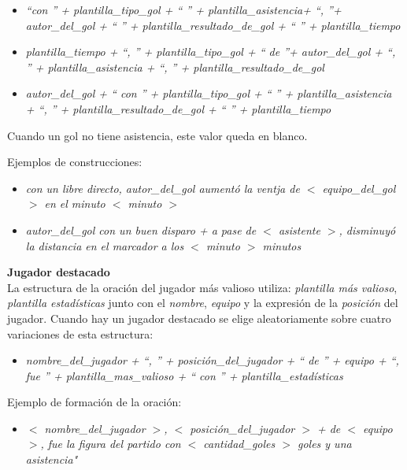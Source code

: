 
    \begin{itemize}
        \item \textit{ “con ” + plantilla\_tipo\_gol + “ ” + plantilla\_asistencia+ “, ”+ autor\_del\_gol + “ ” + plantilla\_resultado\_de\_gol + “ ” + plantilla\_tiempo}
        \item \textit{plantilla\_tiempo + “, ” + plantilla\_tipo\_gol + “ de ”+ autor\_del\_gol + “, ” + plantilla\_asistencia + “, ” + plantilla\_resultado\_de\_gol}
        \item \textit{autor\_del\_gol + “ con ” + plantilla\_tipo\_gol + “ ” + plantilla\_asistencia + “, ” + plantilla\_resultado\_de\_gol + “ ” + plantilla\_tiempo}
    \end{itemize}

    Cuando un gol no tiene asistencia, este valor queda en blanco.

    Ejemplos de construcciones:

    \begin{itemize}
        \item \textit{con un libre directo, autor\_del\_gol aumentó la ventja de $<$ equipo\_del\_gol $>$ en el minuto $<$ minuto $>$}
        \item \textit{autor\_del\_gol con un buen disparo + a pase de $<$ asistente $>$, disminuyó la distancia en el marcador a los $<$ minuto $>$ minutos} 
    \end{itemize}

\textbf{Jugador destacado}\\

    La estructura de la oración del jugador más valioso utiliza: \textit{plantilla más valioso}, \textit{plantilla estadísticas} junto con el \textit{nombre}, 
\textit{equipo} y la expresión de la  \textit{posición} del jugador.
    Cuando hay un jugador destacado se elige aleatoriamente sobre cuatro variaciones de esta estructura:
    
    \begin{itemize}
        \item \textit{nombre\_del\_jugador + “, ” + posición\_del\_jugador + “ de ” + equipo + “, fue ” + plantilla\_mas\_valioso + “ con ” +  plantilla\_estadísticas}
    \end{itemize}

    Ejemplo de formación de la oración:

    \begin{itemize}
        \item \textit{$<$ nombre\_del\_jugador $>$, $<$ posición\_del\_jugador $>$ + de $<$ equipo $>$, fue la figura del partido con $<$ cantidad\_goles $>$ goles y una asistencia" }
    \end{itemize}

